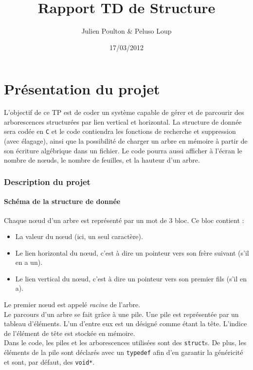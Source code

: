 \documentclass[a4paper,11pt] {article}
\title{Rapport TD de Structure}
\author{Julien Poulton & Peluso Loup}
\date{17/03/2012}
\begin{document}
\part{Présentation du projet}

  L'objectif de ce TP est de coder un système capable de gérer et de parcourir des arborescences structurées par lien vertical et horizontal. La structure de donnée sera codée en \verb?C? et le code contiendra les fonctions de recherche et suppression (avec élagage), ainsi que la possibilité de charger un arbre en mémoire à partir de son écriture algébrique dans un fichier. Le code pourra aussi afficher à l'écran le nombre de nœuds, le nombre de feuilles, et la hauteur d'un arbre.

\section{Description du projet}

\subsection{Schéma de la structure de donnée}

Chaque nœud d'un arbre est représenté par un mot de 3 bloc. Ce bloc contient :

\vspace{0.5cm}
	
\begin{itemize}
\item La valeur du nœud (ici, un seul caractère).
\item Le lien horizontal du nœud, c'est à dire un pointeur vers son frère suivant (s'il en a un).
\item Le lien vertical du nœud, c'est à dire un pointeur vers son premier fils (s'il en a).
\end{itemize}

\vspace{0.5cm}

Le premier nœud est appelé \emph{racine} de l'arbre.\\

Le parcours d'un arbre se fait grâce à une pile. Une pile est représentée par un tableau d'éléments. L'un d'entre eux est un désigné comme étant la tête. L'indice de l'élément de tête est stockée en mémoire.\\

Dans le code, les piles et les arborescences utilisées sont des \verb#struct#s. De plus, les éléments de la pile sont déclarés avec un \verb#typedef# afin d'en garantir la généricité et sont, par défaut, des \verb#void*#.
\end{document}
